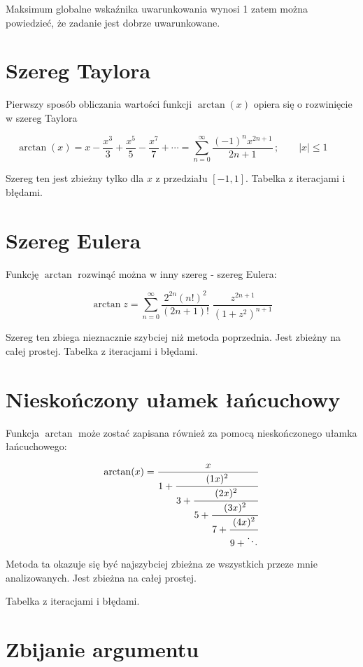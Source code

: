 \documentclass{article}
\begin{document}
\indent Maksimum globalne wskaźnika uwarunkowania wynosi 1 zatem można powiedzieć, że zadanie jest dobrze uwarunkowane.

\section{Szereg Taylora}
Pierwszy sposób obliczania wartości funkcji $\arctan(x)$ opiera się o rozwinięcie w szereg Taylora

\begin{equation}
\arctan(x)=x-{\frac {x^{3}}{3}}+{\frac {x^{5}}{5}}-{\frac {x^{7}}{7}}+\cdots =\sum _{n=0}^{\infty }{\frac {(-1)^{n}x^{2n+1}}{2n+1}}\,;\qquad |x|\leq 1\qquad 
\end{equation}

Szereg ten jest zbieżny tylko dla $x$ z przedziału $[-1,1]$.
Tabelka z iteracjami i błędami.

\section{Szereg Eulera}

Funkcję $\arctan$ rozwinąć można w inny szereg - szereg Eulera:

\begin{equation}
\arctan z=\sum _{n=0}^{\infty }{\frac {2^{2n}(n!)^{2}}{(2n+1)!}}\;{\frac {z^{2n+1}}{(1+z^{2})^{n+1}}}
\end{equation}

Szereg ten zbiega nieznacznie szybciej niż metoda poprzednia.
Jest zbieżny na całej prostej.
Tabelka z iteracjami i błędami.

\section{Nieskończony ułamek łańcuchowy}
Funkcja $\arctan$ może zostać zapisana również za pomocą nieskończonego ułamka łańcuchowego:

\begin{equation}
\arctan(x)={\frac {x}{1+{\cfrac {(1x)^{2}}{3+{\cfrac {(2x)^{2}}{5+{\cfrac {(3x)^{2}}{7+{\cfrac {(4x)^{2}}{9+\ddots }}}}}}}}}}
\end{equation}

Metoda ta okazuje się być najszybciej zbieżna ze wszystkich przeze mnie analizowanych. Jest zbieżna na całej prostej.

Tabelka z iteracjami i błędami.

\section{Zbijanie argumentu}
\end{document}
